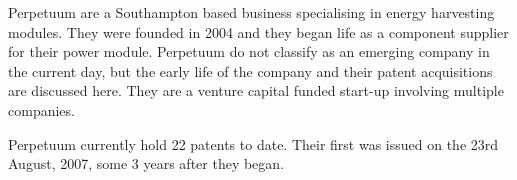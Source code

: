 {}


Perpetuum are a Southampton based business specialising in energy harvesting modules. 
They were founded in 2004 and they began life as a component supplier for their power module.
Perpetuum do not classify as an emerging company in the current day, but the early life of the company and their patent acquisitions are discussed here. 
They are a venture capital funded start-up involving multiple companies.

Perpetuum currently hold 22 patents to date. 
Their first was issued on the 23rd August, 2007, some 3 years after they began.



